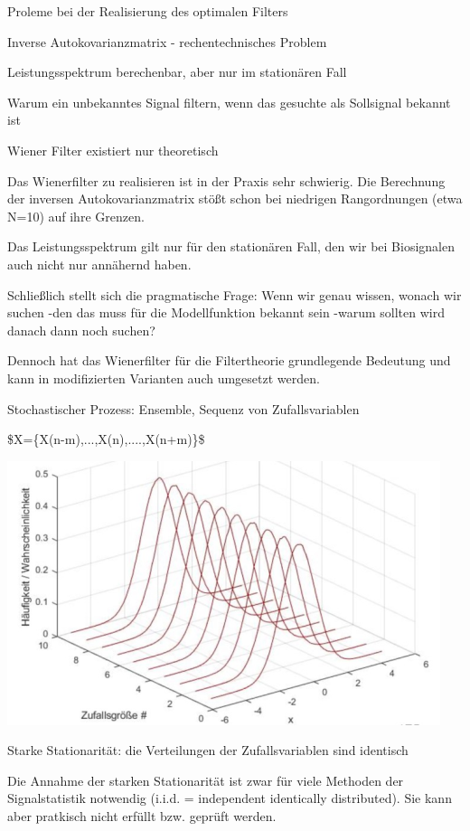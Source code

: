 \documentclass[a4paper]{article}
\begin{document}
\begin{multicols}{3}
  Proleme bei der Realisierung des optimalen Filters

  \begin{itemize*}
    \item Inverse Autokovarianzmatrix - rechentechnisches Problem
    \item Leistungsspektrum berechenbar, aber nur im stationären Fall
    \item Warum ein unbekanntes Signal filtern, wenn das gesuchte als Sollsignal bekannt ist
    \begin{itemize*}
      \item Wiener Filter existiert nur theoretisch
      \item Das Wienerfilter zu realisieren ist in der Praxis sehr schwierig. Die Berechnung der inversen Autokovarianzmatrix stößt schon bei niedrigen Rangordnungen (etwa N=10) auf ihre Grenzen.
      \item Das Leistungsspektrum gilt nur für den stationären Fall, den wir bei Biosignalen auch nicht nur annähernd haben.
      \item Schließlich stellt sich die pragmatische Frage: Wenn wir genau wissen, wonach wir suchen -den das muss für die Modellfunktion bekannt sein -warum sollten wird danach dann noch suchen?
      \item Dennoch hat das Wienerfilter für die Filtertheorie grundlegende Bedeutung und kann in modifizierten Varianten auch umgesetzt werden.
    \end{itemize*}
  \end{itemize*}

  Stochastischer Prozess: Ensemble, Sequenz von Zufallsvariablen

  \begin{itemize*}
    \item \$X=\{X(n-m),...,X(n),....,X(n+m)\}\$
    \item \includegraphics[width=.5\linewidth]{Assets/Biosignalverarbeitung-adaptiver-filter-stochastik.png}
    \item Starke Stationarität: die Verteilungen der Zufallsvariablen sind identisch
    \item Die Annahme der starken Stationarität ist zwar für viele Methoden der Signalstatistik notwendig (i.i.d. = independent identically distributed). Sie kann aber pratkisch nicht erfüllt bzw. geprüft werden.
  \end{itemize*}


\end{multicols}
\end{document}

